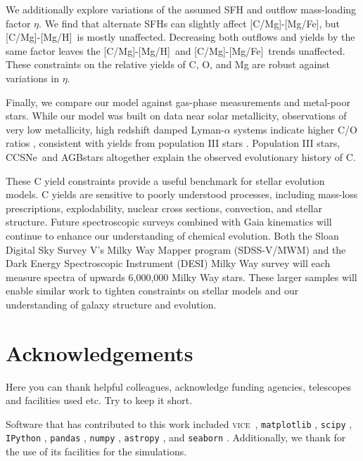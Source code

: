 \documentclass[fleqn,usenatbib]{mnras}
\newcommand{\VICE}{\textsc{vice}}
\newcommand{\cc}{CCSNe}
\newcommand{\agb}{AGB}
\newcommand{\sfh}{SFH}
\newcommand{\caah}{[C/Mg]-[Mg/H]}
\newcommand{\caafe}{[C/Mg]-[Mg/Fe]}
\begin{document}
We additionally explore variations of the assumed \sfh{} and outflow mass-loading factor $\eta$. We find that alternate \sfh{}s can slightly affect \caafe, but \caah~is mostly unaffected. Decreasing both outflows and yields by the same factor leaves the \caah~and \caafe~trends unaffected. These constraints on the relative yields of C, O, and Mg are robust against variations in $\eta$.

Finally, we compare our model against gas-phase measurements and metal-poor stars. While our model was built on data near solar metallicity, observations of very low metallicity, high redshift damped Lyman-$\alpha$ systems indicate higher C/O ratios \citep{cooke+17}, consistent with yields from population III stars \citep[e.g.][]{hirschi07}. Population III stars, \cc\, and \agb stars altogether explain the observed evolutionary history of C.

These C yield constraints provide a useful benchmark for stellar evolution models. C yields are sensitive to poorly understood processes, including mass-loss prescriptions, explodability, nuclear cross sections, convection, and stellar structure. Future spectroscopic surveys combined with Gaia kinematics \citep{gaia} will continue to enhance our understanding of chemical evolution. Both the Sloan Digital Sky Survey V's Milky Way Mapper program ({\sc SDSS-V/MWM}) \citep{sdssv} and the Dark Energy Spectroscopic Instrument ({\sc DESI}) Milky Way survey \citep{desi, desi:mw} will each measure spectra of upwards 6,000,000 Milky Way stars. These larger samples will enable similar work to tighten constraints on stellar models and our understanding of galaxy structure and evolution.




\section*{Acknowledgements}

 Here you can thank helpful
colleagues, acknowledge funding agencies, telescopes and facilities used etc.
Try to keep it short.

Software that has contributed to this work included  
\VICE~\citep{JW20, james+21},
\texttt{matplotlib} \citep{matplotlib},
\texttt{scipy} \citep{scipy},
\texttt{IPython} \citep{ipy},
\texttt{pandas} \citep{pandas},
\texttt{numpy} \citep{numpy},
\texttt{astropy} \citep{astropy:2013, astropy:2018, astropy:2022},
and 
\texttt{seaborn} \citep{seaborn}
.
Additionally, we thank \citet{OhioSupercomputerCenter1987} for the use of its facilities for the simulations. 
\end{document}
